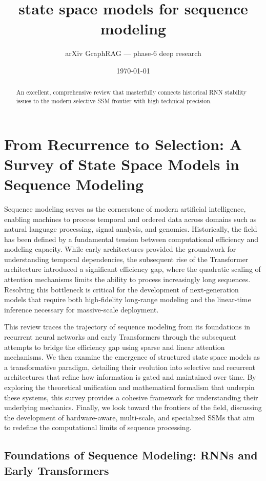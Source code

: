 \documentclass[11pt]{article}
\title{state space models for sequence modeling}
\author{arXiv GraphRAG --- phase-6 deep research}
\date{\today}
\begin{document}
\maketitle

\begin{abstract}
An excellent, comprehensive review that masterfully connects historical RNN stability issues to the modern selective SSM frontier with high technical precision.
\end{abstract}

\section{From Recurrence to Selection: A Survey of State Space Models in Sequence Modeling}

Sequence modeling serves as the cornerstone of modern artificial intelligence, enabling machines to process temporal and ordered data across domains such as natural language processing, signal analysis, and genomics. Historically, the field has been defined by a fundamental tension between computational efficiency and modeling capacity. While early architectures provided the groundwork for understanding temporal dependencies, the subsequent rise of the Transformer architecture introduced a significant efficiency gap, where the quadratic scaling of attention mechanisms limits the ability to process increasingly long sequences. Resolving this bottleneck is critical for the development of next-generation models that require both high-fidelity long-range modeling and the linear-time inference necessary for massive-scale deployment.

This review traces the trajectory of sequence modeling from its foundations in recurrent neural networks and early Transformers through the subsequent attempts to bridge the efficiency gap using sparse and linear attention mechanisms. We then examine the emergence of structured state space models as a transformative paradigm, detailing their evolution into selective and recurrent architectures that refine how information is gated and maintained over time. By exploring the theoretical unification and mathematical formalism that underpin these systems, this survey provides a cohesive framework for understanding their underlying mechanics. Finally, we look toward the frontiers of the field, discussing the development of hardware-aware, multi-scale, and specialized SSMs that aim to redefine the computational limits of sequence processing.

\subsection{Foundations of Sequence Modeling: RNNs and Early Transformers}
\end{document}

